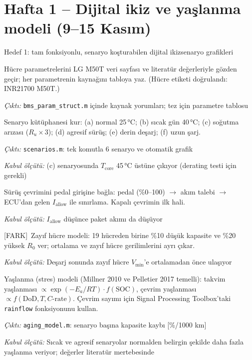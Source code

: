 \documentclass[11pt,a4paper]{article}
\newcommand{\cikti}[1]{\par{\small\textit{Çıktı:} #1}}
\newcommand{\kabul}[1]{\par{\small\textit{Kabul ölçütü:} #1}}
\newcommand{\artı}{\textcolor{ana}{\small[FARK]}\ }
\begin{document}
\section{Hafta 1 -- Dijital ikiz ve yaşlanma modeli (9--15 Kasım)}
\begin{faz}{Hedef 1: tam fonksiyonlu, senaryo koşturabilen dijital ikiz}{senaryo grafikleri}
\end{faz}
\begin{gorev}
  \item[$\boxtimes$] Hücre parametrelerini LG M50T veri sayfası ve literatür değerleriyle gözden geçir; her parametrenin kaynağını tabloya yaz. (Hücre etiketi doğrulandı: INR21700 M50T.)
  \cikti{\texttt{bms\_param\_struct.m} içinde kaynak yorumları; tez için parametre tablosu}
  \item[$\boxtimes$] Senaryo kütüphanesi kur: (a) normal 25\,°C; (b) sıcak gün 40\,°C; (c) soğutma arızası ($R_u\times3$); (d) agresif sürüş; (e) derin deşarj; (f) uzun şarj.
  \cikti{\texttt{scenarios.m}: tek komutla 6 senaryo ve otomatik grafik}
  \kabul{(c) senaryosunda $T_\text{core}$ 45\,°C üstüne çıkıyor (derating testi için gerekli)}
  \item[$\boxtimes$] Sürüş çevrimini pedal girişine bağla: pedal (\%0--100) $\rightarrow$ akım talebi $\rightarrow$ ECU'dan gelen $I_\text{allow}$ ile sınırlama. Kapalı çevrimin ilk hali.
  \kabul{$I_\text{allow}$ düşünce paket akımı da düşüyor}
  \item[$\boxtimes$] \artı Zayıf hücre modeli: 19 hücreden birine \%10 düşük kapasite ve \%20 yüksek $R_0$ ver; ortalama ve zayıf hücre gerilimlerini ayrı çıkar.
  \kabul{Deşarj sonunda zayıf hücre $V_\text{min}$'e ortalamadan önce ulaşıyor}
  \item[$\boxtimes$] Yaşlanma (stres) modeli (Millner 2010 ve Pelletier 2017 temelli):
  takvim yaşlanması $\propto \exp(-E_a/RT)\cdot f(\text{SOC})$, çevrim yaşlanması $\propto f(\text{DoD}, T, C\text{-rate})$.
  Çevrim sayımı için Signal Processing Toolbox'taki \texttt{rainflow} fonksiyonunu kullan.
  \cikti{\texttt{aging\_model.m}: senaryo başına kapasite kaybı [\%/1000 km]}
  \kabul{Sıcak ve agresif senaryolar normalden belirgin şekilde daha fazla yaşlanma veriyor; değerler literatür mertebesinde}
\end{gorev}

\end{document}
